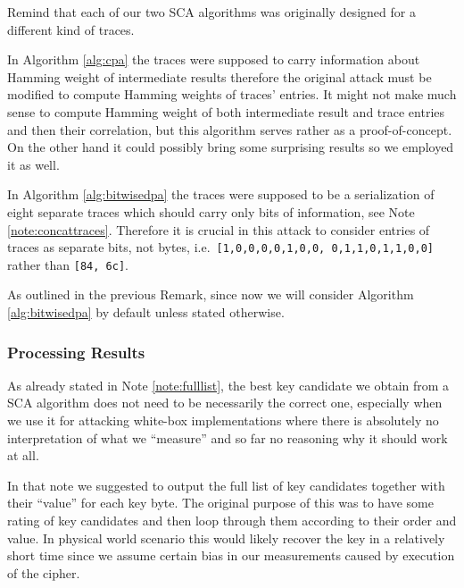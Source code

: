 \begin{remark}
\label{rem:traceformat}
	Remind that each of our two SCA algorithms was originally designed for a different kind of traces.
	
	In Algorithm \ref{alg:cpa} the traces were supposed to carry information about Hamming weight of intermediate results therefore the original attack must be modified to compute Hamming weights of traces' entries. It might not make much sense to compute Hamming weight of both intermediate result and trace entries and then their correlation, but this algorithm serves rather as a proof-of-concept. On the other hand it could possibly bring some surprising results so we employed it as well.
	
	In Algorithm \ref{alg:bitwisedpa} the traces were supposed to be a serialization of eight separate traces which should carry only bits of information, see Note \ref{note:concattraces}. Therefore it is crucial in this attack to consider entries of traces as separate bits, not bytes, i.e.\ {\tt [1,0,0,0,0,1,0,0, 0,1,1,0,1,1,0,0]} rather than {\tt [84, 6c]}.
\end{remark}

As outlined in the previous Remark, since now we will consider Algorithm \ref{alg:bitwisedpa} by default unless stated otherwise.

\subsubsection{Processing Results}
	
	As already stated in Note \ref{note:fulllist}, the best key candidate we obtain from a SCA algorithm does not need to be necessarily the correct one, especially when we use it for attacking white-box implementations where there is absolutely no interpretation of what we ``measure'' and so far no reasoning why it should work at all.
	
	In that note we suggested to output the full list of key candidates together with their ``value'' for each key byte. The original purpose of this was to have some rating of key candidates and then loop through them according to their order and value. In physical world scenario this would likely recover the key in a relatively short time since we assume certain bias in our measurements caused by execution of the cipher.
	
